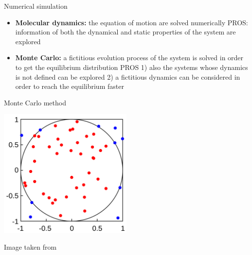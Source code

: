 \documentclass{beamer}
\begin{document}
\begin{frame}{Numerical simulation \cite{peliti2011statistical}}
\begin{itemize}
\item\textbf{Molecular dynamics:} the equation of motion are solved numerically PROS: information of both the dynamical and static properties of the system are explored 
\item\textbf{Monte Carlo:} a fictitious evolution process of the system is solved in order to get the equilibrium distribution PROS  1) also the systems whose dynamics is not defined can be explored 2) a fictitious dynamics can be considered in order to reach the equilibrium faster 
\end{itemize}
\end{frame}


\begin{frame} {Monte Carlo method \cite{frenkel2001understanding}}
 \begin{center}
     \includegraphics[width=0.5\textwidth]{Pic/MonteCarloIntegrationCircle.png}
\end{center}
 \begin{center}
Image taken from \cite{PBC}
\end{center}
\end{frame}
\end{document}
